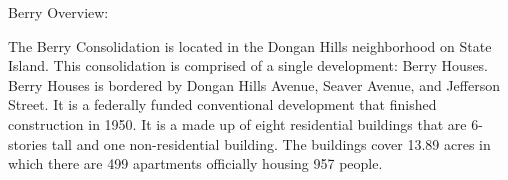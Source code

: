 Berry Overview:       

     

The Berry Consolidation is located in the Dongan Hills neighborhood on State Island. This consolidation is comprised of a single development: Berry Houses. Berry Houses is bordered by Dongan Hills Avenue, Seaver Avenue, and Jefferson Street. It is a federally funded conventional development that finished construction in 1950. It is a made up of eight residential buildings that are 6- stories tall and one non-residential building. The buildings cover 13.89 acres in which there are 499 apartments officially housing 957 people.
